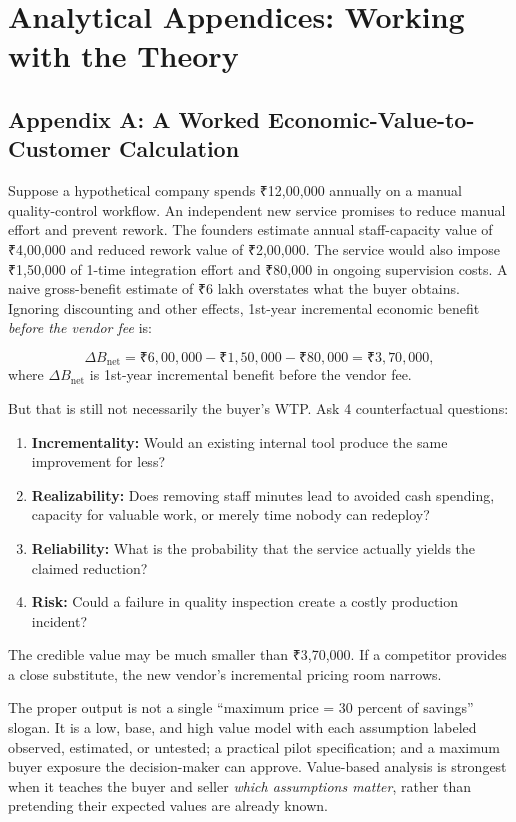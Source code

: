 \section*{Analytical Appendices: Working with the Theory}

\subsection*{Appendix A: A Worked Economic-Value-to-Customer Calculation}

Suppose a hypothetical company spends ₹12,00,000 annually on a manual quality-control workflow. An independent new service promises to reduce manual effort and prevent rework. The founders estimate annual staff-capacity value of ₹4,00,000 and reduced rework value of ₹2,00,000. The service would also impose ₹1,50,000 of 1-time integration effort and ₹80,000 in ongoing supervision costs. A naive gross-benefit estimate of ₹6 lakh overstates what the buyer obtains. Ignoring discounting and other effects, 1st-year incremental economic benefit \emph{before the vendor fee} is:

\begin{equation}
\Delta B_{\text{net}} = ₹6{,}00{,}000 - ₹1{,}50{,}000 - ₹80{,}000 = \text{₹}3{,}70{,}000,
\end{equation}
where $\Delta B_{\text{net}}$ is 1st-year incremental benefit before the vendor fee.

But that is still not necessarily the buyer's WTP. Ask 4 counterfactual questions:
\begin{enumerate}
\item \textbf{Incrementality:} Would an existing internal tool produce the same improvement for less?
\item \textbf{Realizability:} Does removing staff minutes lead to avoided cash spending, capacity for valuable work, or merely time nobody can redeploy?
\item \textbf{Reliability:} What is the probability that the service actually yields the claimed reduction?
\item \textbf{Risk:} Could a failure in quality inspection create a costly production incident?
\end{enumerate}

The credible value may be much smaller than ₹3,70,000. If a competitor provides a close substitute, the new vendor's incremental pricing room narrows.

The proper output is not a single ``maximum price = 30 percent of savings'' slogan. It is a low, base, and high value model with each assumption labeled observed, estimated, or untested; a practical pilot specification; and a maximum buyer exposure the decision-maker can approve. Value-based analysis is strongest when it teaches the buyer and seller \emph{which assumptions matter}, rather than pretending their expected values are already known.

